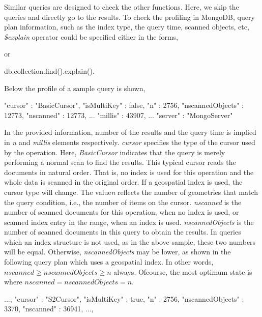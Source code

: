 \documentclass[a4paper,12pt]{article}
\begin{document}
Similar queries are designed to check the other functions. Here, we skip the queries and directly go to the results. To check the profiling in MongoDB, query plan information, such as the index type, the query time, scanned objects, etc, \textit{\$explain} operator could be specified either in the forms,
\vspace{10px}
 or 
 \begin{fakeJSON}
db.collection.find().explain().
 \end{fakeJSON}
\vspace{10px}
Below the profile of a sample query is shown,
\vspace{10px}
\begin{fakeJSON}
"cursor" : "BasicCursor",
"isMultiKey" : false,
"n" : 2756,
"nscannedObjects" : 12773,
"nscanned" : 12773,
...
"millis" : 43907,
...
"server" : "MongoServer"
\end{fakeJSON}
\vspace{10px}

In the provided information, number of the results and the query time is implied in \textit{n} and \textit{millis} elements respectively. \textit{cursor} specifies the type of the cursor used by the operation. Here, \textit{BasicCursor} indicates that the query is merely performing a normal scan to find the results.  This typical cursor reads the documents in natural order. That is, no index is used for this operation and the whole data is scanned in the original order. If a geospatial index is used, the cursor type will change. The value\textit{n} reflects the number of geometries that match the query condition, i.e., the number of items on the cursor. \textit{nscanned} is the number of scanned documents for this operation, when no index is used, or scanned index entry in the range, when an index is used. \textit{nscannedObjects} is the number of scanned documents in this query to obtain the results. In queries which an index structure is not used, as in the above sample, these two numbers will be equal. Otherwise, \textit{nscannedObjects} may be lower, as shown in the following query plan which uses a geospatial index. 
In other words, $nscanned\geq nscannedObjects\geq n$ always. Ofcourse, the most optimum state is where $nscanned=nscannedObjects=n$. 
\vspace{10px}
\begin{fakeJSON}
...,
"cursor" : "S2Cursor",
"isMultiKey" : true,
"n" : 2756,
"nscannedObjects" : 3370,
"nscanned" : 36941,
...,
\end{fakeJSON}
\vspace{10px}
\end{document}
